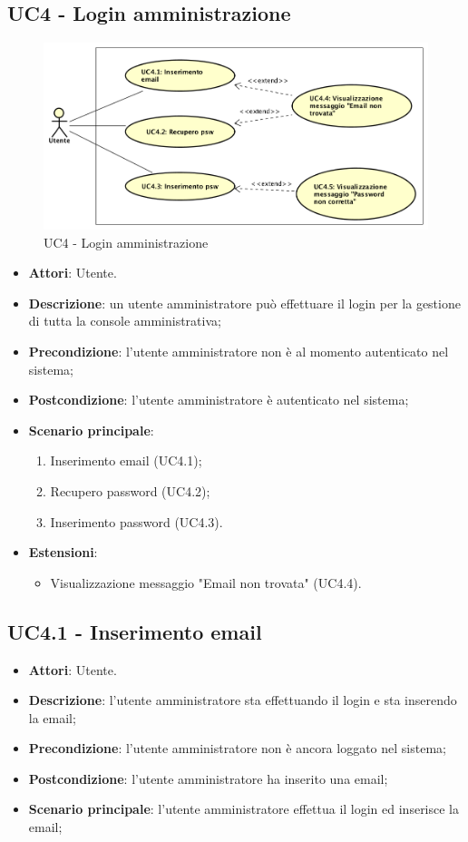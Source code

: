 \documentclass[../AnalisiDeiRequisiti_v3.0.0.tex]{subfiles}
\begin{document}
\subsection{UC4 - Login amministrazione} 
\label{sssec:UC4} 
\begin{figure}[!h]
	\centering
	\includegraphics[width=\textwidth]{UseCases/UC4_LoginAmministrazione/UC4_LoginAmministrazione.png}
	\caption{UC4 - Login amministrazione}
\end{figure}
\begin{itemize} 
\item \textbf{Attori}: Utente.
\item \textbf{Descrizione}: un utente amministratore può effettuare il login per la gestione di tutta la console amministrativa;
\item \textbf{Precondizione}: l'utente amministratore non è al momento autenticato nel sistema;
\item \textbf{Postcondizione}: l'utente amministratore è autenticato nel sistema;
\item \textbf{Scenario principale}: \begin{enumerate}\item Inserimento email (UC4.1);\item Recupero password (UC4.2);\item Inserimento password (UC4.3). 
 \end{enumerate}
\item \textbf{Estensioni}:\begin{itemize}\item Visualizzazione messaggio "Email non trovata" (UC4.4).\end{itemize}
\end{itemize} 
\subsection{UC4.1 - Inserimento email} 
\label{sssec:UC4.1} 
\begin{itemize} 
\item \textbf{Attori}: Utente.
\item \textbf{Descrizione}: l'utente amministratore sta effettuando il login e sta inserendo la email;
\item \textbf{Precondizione}: l'utente amministratore non è ancora loggato nel sistema;
\item \textbf{Postcondizione}: l'utente amministratore ha inserito una email;
\item \textbf{Scenario principale}: l'utente amministratore effettua il login ed inserisce la email;
\end{itemize} 
\end{document}
